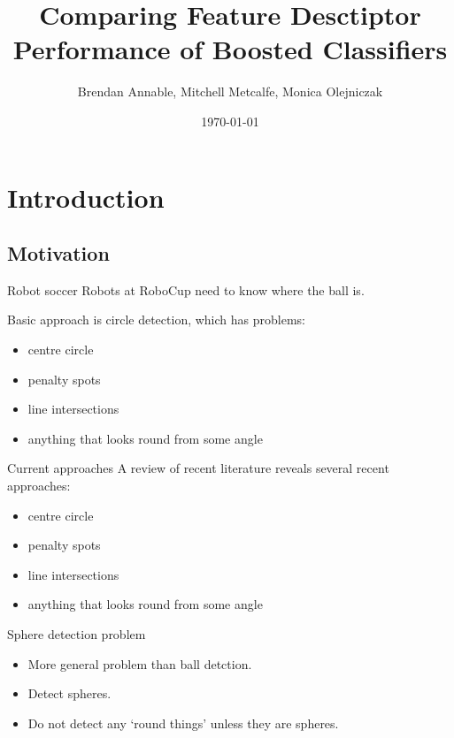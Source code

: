 \documentclass{beamer}
\title{Comparing Feature Desctiptor Performance of Boosted Classifiers }
\author{Brendan Annable, Mitchell Metcalfe, Monica Olejniczak}
\institute{The University of Newcastle, Australia}
\date{\today}
\newcommand{\scarequotes}[1]{`#1'}
\begin{document}
	\maketitle

	

\section{Introduction}

	\subsection{Motivation}

	\begin{frame}{Robot soccer}
		Robots at RoboCup \citep{KitanoAKNO97} need to know where the ball is.

		Basic approach is circle detection, which has problems:
		\begin{itemize}
			\item centre circle
	        \item penalty spots
	        \item line intersections
	        \item anything that looks round from some angle
		\end{itemize}
	\end{frame}

	\begin{frame}{Current approaches}
		A review of recent literature reveals several recent approaches:
		\begin{itemize}
			\item centre circle
	        \item penalty spots
	        \item line intersections
	        \item anything that looks round from some angle
		\end{itemize}
	\end{frame}

	\begin{frame}{Sphere detection problem}
		\begin{itemize}
			\item More general problem than ball detction.
			\item Detect spheres.
			\item Do not detect any \scarequotes{round things} unless they are spheres.
		\end{itemize}
	\end{frame}
\end{document}
